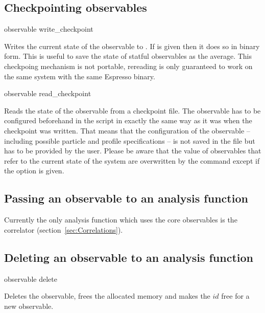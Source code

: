 \subsection{Checkpointing observables}
\begin{essyntax}
observable  write_checkpoint  
\end{essyntax}
Writes the current state of the observable to .
If  is given then it does so in binary form. This is useful
to save the state of statful observables as the average.
This checkpoing mechanism is not portable, rereading is only guaranteed to work
on the same system with the same Espresso binary.

\begin{essyntax}
observable  read_checkpoint  
\end{essyntax}
Reads the state of the observable from a checkpoint file. The observable
has to be configured beforehand in the script in exactly the same way
as it was when the checkpoint was written. That means that the configuration
of the observable -- including possible particle and profile specifications -- is not saved in the file
but has to be provided by the user. Please be aware that the value of observables that refer to the
current state of the system are overwritten by the  command except if the option  is given.

\subsection{Passing an observable to an analysis function}
Currently the only analysis function which uses the core observables
is the correlator (section~\ref{sec:Correlations}).

\subsection{Deleting an observable to an analysis function}
\begin{essyntax}
observable  delete
\end{essyntax}
Deletes the observable, \ie frees the allocated memory
and makes the $id$ free for a new observable.


